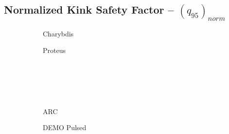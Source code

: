 \clearpage

\newpage

\subsection*{ Normalized Kink Safety Factor -- $(q_{95})_{norm}$ }
  \label{subsection:scan_norm_q_95}

\begin{figure*}[h!]
    \centering
    \hfill
    \begin{subfigure}[t]{0.45\textwidth}
        \centering
    \begin{adjustbox}{width=\textwidth}
      \Large
      
    \end{adjustbox}
        \caption{Charybdis}
    \end{subfigure}
    \hfill
    \begin{subfigure}[t]{0.45\textwidth}
        \centering
    \begin{adjustbox}{width=\textwidth}
      \Large
      
    \end{adjustbox}
        \caption{Proteus}
    \end{subfigure}
    \hfill \hfill ~\\ ~\\ ~\\ ~\\
    \hfill
    \begin{subfigure}[t]{0.45\textwidth}
        \centering
    \begin{adjustbox}{width=\textwidth}
      \Large
      
    \end{adjustbox}
        \caption{ARC}
    \end{subfigure}
    \hfill
    \begin{subfigure}[t]{0.45\textwidth}
        \centering
    \begin{adjustbox}{width=\textwidth}
      \Large
      
    \end{adjustbox}
        \caption{DEMO Pulsed}
    \end{subfigure}
    \hfill \hfill ~\\ ~\\ ~\\ ~\\
    \hfill
    \begin{subfigure}[t]{0.45\textwidth}
        \centering

\end{subfigure}
\end{figure*}

